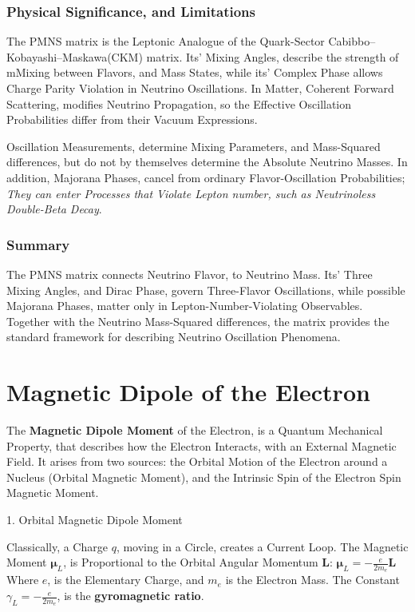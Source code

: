 \documentclass[a4paper, 10pt, onepage]{elegantbook}
\begin{document}
{\subsection{Physical Significance, and Limitations}  

The PMNS matrix is the Leptonic Analogue of the Quark-Sector Cabibbo–Kobayashi–Maskawa(CKM) matrix. Its' Mixing 
Angles, describe the strength of mMixing between Flavors, and Mass States, while its' Complex Phase allows Charge 
Parity Violation in Neutrino Oscillations. In Matter, Coherent Forward Scattering, modifies Neutrino Propagation, so 
the Effective Oscillation Probabilities differ from their Vacuum Expressions.  

Oscillation Measurements, determine Mixing Parameters, and Mass-Squared differences, but do not by themselves determine 
the Absolute Neutrino Masses. In addition, Majorana Phases, cancel from ordinary Flavor-Oscillation Probabilities; 
\emph{They can enter Processes that Violate Lepton number, such as Neutrinoless Double-Beta Decay}.  

\subsection{Summary} 

The PMNS matrix connects Neutrino Flavor, to Neutrino Mass. Its' Three Mixing Angles, and Dirac Phase, govern 
Three-Flavor Oscillations, while possible Majorana Phases, matter only in Lepton-Number-Violating Observables. Together 
with the Neutrino Mass-Squared differences, the matrix provides the standard framework for describing Neutrino
Oscillation Phenomena.


\newpage

\chapter{Magnetic Dipole of the Electron}

\noindent

The \textbf{Magnetic Dipole Moment} of the Electron, is a Quantum Mechanical Property, that describes how the Electron 
Interacts, with an External Magnetic Field. It arises from two sources: the Orbital Motion of the Electron around a 
Nucleus (Orbital Magnetic Moment), and the Intrinsic Spin of the Electron Spin Magnetic Moment.  

    1. Orbital Magnetic Dipole Moment  

Classically, a Charge $q$, moving in a Circle, creates a Current Loop. The Magnetic Moment $\boldsymbol{\mu}_L$, is 
Proportional to the Orbital Angular Momentum $\mathbf{L}$:  
$ \boldsymbol{\mu}_L = -\frac{e}{2m_e} \mathbf{L} $  
Where $e$, is the Elementary Charge, and $m_e$ is the Electron Mass. The Constant $\gamma_L = -\frac{e}{2m_e}$, is the 
\textbf{gyromagnetic ratio}.  

}
\end{document}

